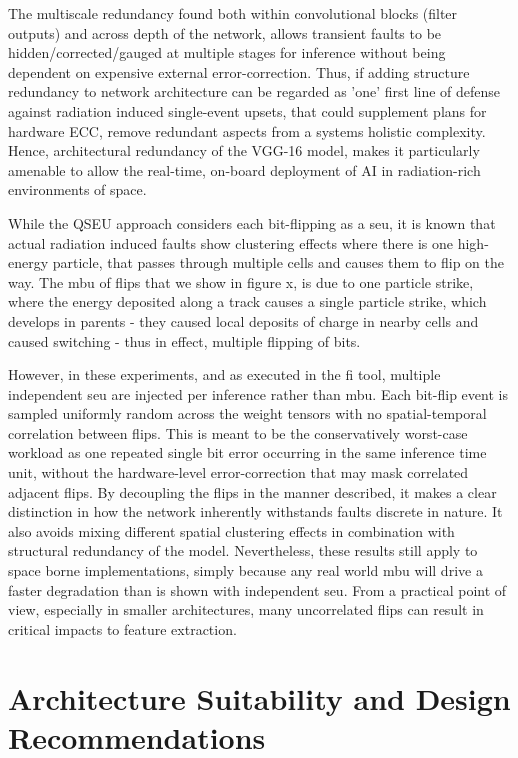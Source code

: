 The multiscale redundancy found both within convolutional blocks (filter outputs) and across depth of the network, allows transient faults to be hidden/corrected/gauged at multiple stages for inference without being dependent on expensive external error-correction. Thus, if adding structure redundancy to network architecture can be regarded as 'one' first line of defense against radiation induced single-event upsets, that could supplement plans for hardware ECC, remove redundant aspects from a systems holistic complexity. Hence, architectural redundancy of the VGG-16 model, makes it particularly amenable to allow the real-time, on-board deployment of AI in radiation-rich environments of space.

While the QSEU approach considers each bit-flipping as a \gls{seu}, it is known that actual radiation induced faults show clustering effects where there is one high-energy particle, that passes through multiple cells and causes them to flip on the way. The \gls{mbu} of flips that we show in figure x, is due to one particle strike, where the energy deposited along a track causes a single particle strike, which develops in parents - they caused local deposits of charge in nearby cells and caused switching - thus in effect, multiple flipping of bits.


However, in these experiments, and as executed in the \gls{fi} tool, multiple independent \gls{seu} are injected per inference rather than \gls{mbu}. Each bit-flip event is sampled uniformly random across the weight tensors with no spatial-temporal correlation between flips. This is meant to be the conservatively worst-case workload as one repeated single bit error occurring in the same inference time unit, without the hardware-level error-correction that may mask correlated adjacent flips. By decoupling the flips in the manner described, it makes a clear distinction in how the network inherently withstands faults discrete in nature. It also avoids mixing different spatial clustering effects in combination with structural redundancy of the model. Nevertheless, these results still apply to space borne implementations, simply because any real world \gls{mbu} will drive a faster degradation than is shown with independent \gls{seu}. From a practical point of view, especially in smaller architectures, many uncorrelated flips can result in critical impacts to feature extraction.

\section{Architecture Suitability and Design Recommendations}

